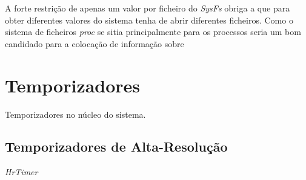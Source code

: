 A forte restrição de apenas um valor por ficheiro do \textit{SysFs} obriga a
que para obter diferentes valores do sistema tenha de abrir diferentes
ficheiros. Como o sistema de ficheiros \textit{proc} se sitia principalmente
para os processos seria um bom candidado para a colocação de informação sobre 

\section{Temporizadores}

Temporizadores no núcleo do sistema.


\subsection{Temporizadores de Alta-Resolução}

\textit{HrTimer}
